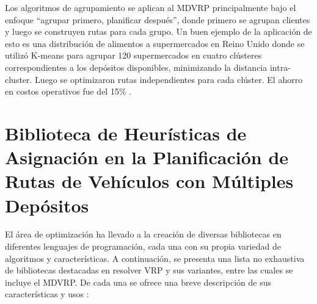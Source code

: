 


Los algoritmos de agrupamiento se aplican al MDVRP principalmente bajo el enfoque ``agrupar primero, planificar después'', donde primero se agrupan clientes y luego se construyen rutas para cada grupo. Un buen ejemplo de la aplicación de esto es una distribución de alimentos a supermercados en Reino Unido donde se utilizó K-means para agrupar 120 supermercados en cuatro clústeres correspondientes a los depósitos disponibles, minimizando la distancia intra-cluster. Luego se optimizaron rutas independientes para cada clúster. El ahorro en costos operativos fue del 15\% \parencite{salhiHeuristicAlgorithmMultidepot1998}.

\section{Biblioteca de Heurísticas de Asignación en la Planificación de Rutas de Vehículos con Múltiples Depósitos}

El área de optimización ha llevado a la creación de diversas bibliotecas en diferentes lenguajes de programación, cada una con su propia variedad de algoritmos y características. A continuación, se presenta una lista no exhaustiva de bibliotecas destacadas en resolver VRP y sus variantes, entre las cuales se incluye el MDVRP. De cada una se ofrece una breve descripción de sus características y usos  \parencite{ericramosaragonIncorporacionModuloMetricas2025}:


